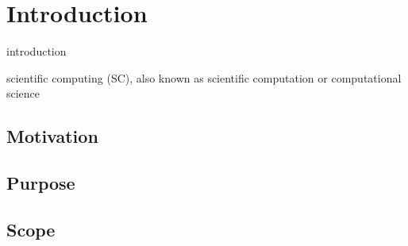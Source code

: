 \chapter{Introduction}
\label{ch_intro}

introduction

scientific computing (SC), also known as scientific computation or computational science

\section{Motivation}

\section{Purpose}

\section{Scope}
